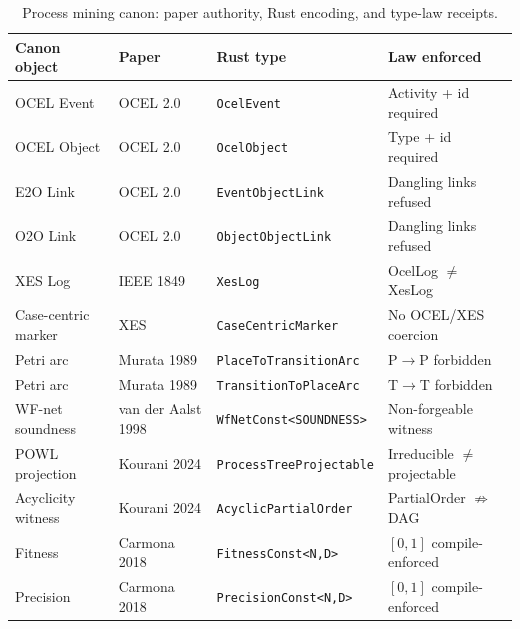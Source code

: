 \begin{table}[ht]
\centering
\caption{Process mining canon: paper authority, Rust encoding, and type-law receipts.}
\label{tab:canon-surface}
\begin{tabular}{@{}p{2.8cm}p{2.6cm}p{3.2cm}p{3.2cm}@{}}
\toprule
\textbf{Canon object} & \textbf{Paper} & \textbf{Rust type} & \textbf{Law enforced} \\
\midrule
OCEL Event          & OCEL 2.0 \cite{berti2023ocel20}         & \texttt{OcelEvent}                     & Activity + id required \\
OCEL Object         & OCEL 2.0 \cite{berti2023ocel20}         & \texttt{OcelObject}                    & Type + id required \\
E2O Link            & OCEL 2.0 \cite{ghahfarokhi2021ocel}     & \texttt{EventObjectLink}               & Dangling links refused \\
O2O Link            & OCEL 2.0 \cite{ghahfarokhi2021ocel}     & \texttt{ObjectObjectLink}              & Dangling links refused \\
XES Log             & IEEE 1849 \cite{ieee2016xes}             & \texttt{XesLog}                        & OcelLog $\neq$ XesLog \\
Case-centric marker & XES \cite{verbeek2010xes}               & \texttt{CaseCentricMarker}             & No OCEL/XES coercion \\
Petri arc           & Murata 1989 \cite{murata1989petri}      & \texttt{PlaceToTransitionArc}          & P$\to$P forbidden \\
Petri arc           & Murata 1989 \cite{murata1989petri}      & \texttt{TransitionToPlaceArc}          & T$\to$T forbidden \\
WF-net soundness    & van der Aalst 1998 \cite{vanderaalst1998workflow} & \texttt{WfNetConst<SOUNDNESS>} & Non-forgeable witness \\
POWL projection     & Kourani 2024 \cite{kourani2024powl}     & \texttt{ProcessTreeProjectable}        & Irreducible $\neq$ projectable \\
Acyclicity witness  & Kourani 2024 \cite{kourani2024powl}     & \texttt{AcyclicPartialOrder}           & PartialOrder $\not\Rightarrow$ DAG \\
Fitness             & Carmona 2018 \cite{carmona2018conformance} & \texttt{FitnessConst<N,D>}          & $[0,1]$ compile-enforced \\
Precision           & Carmona 2018 \cite{carmona2018conformance} & \texttt{PrecisionConst<N,D>}        & $[0,1]$ compile-enforced \\

\end{tabular}
\end{table}
